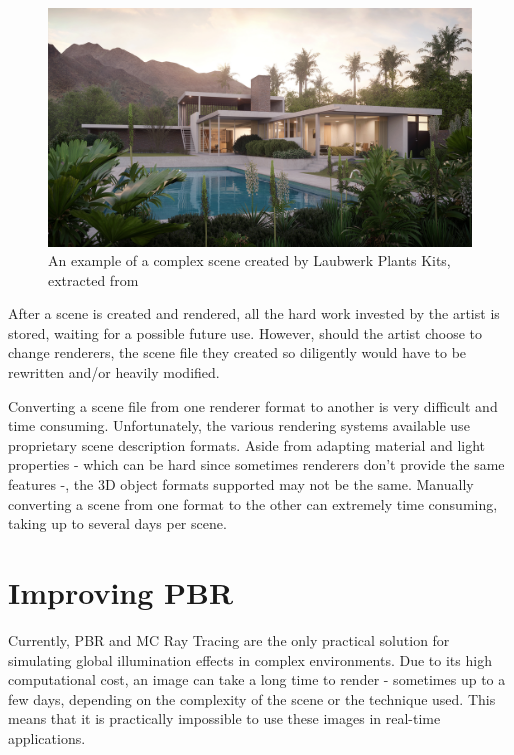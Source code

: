 \begin{figure}[h]
  
\includegraphics[width=\textwidth,height=\textheight,keepaspectratio]{images/1_introduction/Laubwerk-Kit-12_Bauclassroom-Exterior.jpg}
  \caption{An example of a complex scene created by Laubwerk Plants Kits, extracted from \cite{laubwerk}}
  \label{fig:intro_complexScene}
\end{figure}

After a scene is created and rendered, all the hard work invested by the artist 
is stored, waiting for a possible future use. However, should the artist choose 
to change renderers, the scene file they created so diligently would have to be 
rewritten and/or heavily modified.

Converting a scene file from one renderer format to another is very difficult and time consuming. Unfortunately, the various rendering systems available use proprietary scene description formats. Aside from adapting material and light properties - which can be hard since sometimes renderers don't provide the same features -, the 3D object formats supported may not be the same. Manually converting a scene from one format to the other can extremely time consuming, taking up to several days per scene. \cite{tungsten}


\section{Improving PBR}

Currently, PBR and MC Ray Tracing are the only practical solution for simulating global illumination effects in complex environments. Due to its high computational cost, an image can take a long time to render - sometimes up to a few days, depending on the complexity of the scene or the technique used. This means that it is practically impossible to use these images in real-time applications.

